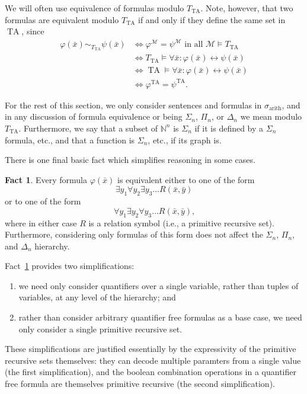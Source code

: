 \documentclass{article}
\theoremstyle{plain}
\theoremstyle{definition}
\newtheorem{fact}[thm]{Fact}
\newcommand{\arithsig}{\sigma_{\operatorname{arith}}}
\newcommand{\tuple}{\bar}
\DeclareMathOperator{\TA}{TA}
\newcommand{\tathy}{T_{\TA}}
\renewcommand{\phi}{\varphi}
\begin{document}
We will often use equivalence of formulas modulo $\tathy$. Note,
however, that two formulas are equivalent modulo $\tathy$ if and only
if they define the same set in $\TA$, since
\begin{align*}
  \phi(\tuple{x}) \sim_{\tathy} \psi(\tuple{x})
  &\iff \phi^\mathcal{M} = \psi^\mathcal{M} \text{ in all } \mathcal{M} \models \tathy \\
  &\iff \tathy \models \forall \tuple{x}: \phi(\tuple{x}) \leftrightarrow \psi(\tuple{x}) \\
  &\iff \TA \models \forall \tuple{x}: \phi(\tuple{x}) \leftrightarrow \psi(\tuple{x}) \\
  &\iff \phi^{\TA} = \psi^{\TA} \text{.}
\end{align*}

For the rest of this section, we only consider sentences and formulas
in $\arithsig$, and in any discussion of formula equivalence or being
$\Sigma_n$, $\Pi_n$, or $\Delta_n$ we mean modulo
$\tathy$. Furthermore, we say that a subset of $\mathbb{N}^n$ is
$\Sigma_n$ if it is defined by a $\Sigma_n$ formula, etc., and that a
function is $\Sigma_n$, etc., if its graph is.

There is one final basic fact which simplifies reasoning in some
cases.

\begin{fact}\label{fact:arith-simpler-normalform}
  Every formula $\phi(\tuple{x})$ is equivalent either to one of the
  form
  $$\exists y_1 \forall y_2 \exists y_3 \ldots R(\tuple{x},\tuple{y})$$
  or to one of the form
  $$\forall y_1 \exists y_2 \forall y_3 \ldots R(\tuple{x},\tuple{y})\text{,}$$
  where in either case $R$ is a relation symbol (i.e., a primitive
  recursive set). Furthermore, considering only formulas of this form
  does not affect the $\Sigma_n$, $\Pi_n$, and $\Delta_n$ hierarchy.
\end{fact}

Fact~\ref{fact:arith-simpler-normalform} provides two simplifications:
\begin{enumerate}
\item we need only consider quantifiers over a single variable, rather
  than tuples of variables, at any level of the hierarchy; and
\item rather than consider arbitrary quantifier free formulas as a
  base case, we need only consider a single primitive recursive set.
\end{enumerate}
These simplifications are justified essentially by the expressivity of
the primitive recursive sets themselves: they can decode multiple
paramters from a single value (the first simplification), and the
boolean combination operations in a quantifier free formula are
themselves primitive recursive (the second simplification).
\end{document}
